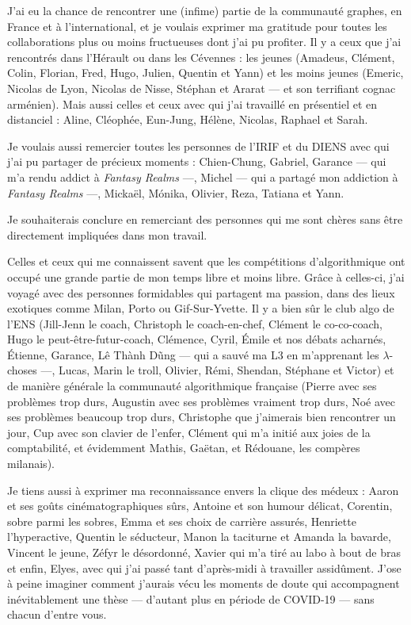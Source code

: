 \medskip

J'ai eu la chance de rencontrer une (infime) partie de la communauté graphes, en France et à l'international, et je voulais exprimer ma gratitude pour toutes les collaborations plus ou moins fructueuses dont j'ai pu profiter. Il y a ceux que j'ai rencontrés dans l'Hérault ou dans les Cévennes : les jeunes (Amadeus, Clément, Colin, Florian, Fred, Hugo, Julien, Quentin et Yann) et les moins jeunes (Emeric, Nicolas de Lyon, Nicolas de Nisse, Stéphan et Ararat — et son terrifiant cognac arménien). Mais aussi celles et ceux avec qui j'ai travaillé en présentiel et en distanciel : Aline, Cléophée, Eun-Jung, Hélène, Nicolas, Raphael et Sarah.

\smallskip
Je voulais aussi remercier toutes les personnes de l'IRIF et du DIENS avec qui j'ai pu partager de précieux moments : Chien-Chung, Gabriel, Garance — qui m'a rendu addict à \emph{Fantasy Realms} —, Michel — qui a partagé mon addiction à \emph{Fantasy Realms} —, Mickaël, Mónika, Olivier, Reza, Tatiana et Yann.

\bigskip

Je souhaiterais conclure en remerciant des personnes qui me sont chères sans être directement impliquées dans mon travail.


\medskip


Celles et ceux qui me connaissent savent que les compétitions d'algorithmique ont occupé une grande partie de mon temps libre et moins libre. Grâce à celles-ci, j'ai voyagé avec des personnes formidables qui partagent ma passion, dans des lieux exotiques comme Milan, Porto ou Gif-Sur-Yvette.
Il y a bien sûr le club algo de l'ENS (Jill-Jenn le coach, Christoph le coach-en-chef, Clément le co-co-coach, Hugo le peut-être-futur-coach, Clémence, Cyril, Émile et nos débats acharnés, Étienne, Garance, Lê Thành Dũng — qui a sauvé ma L3 en m'apprenant les $\lambda$-choses —, Lucas, Marin le troll, Olivier, Rémi, Shendan, Stéphane et Victor) et de manière générale la communauté algorithmique française (Pierre avec ses problèmes trop durs, Augustin avec ses problèmes vraiment trop durs, Noé avec ses problèmes beaucoup trop durs, Christophe que j'aimerais bien rencontrer un jour, Cup avec son clavier de l'enfer, Clément qui m'a initié aux joies de la comptabilité, et évidemment Mathis,  Gaëtan, et Rédouane, les compères milanais).


\smallskip

Je tiens aussi à exprimer ma reconnaissance envers la clique des médeux : Aaron et ses goûts cinématographiques sûrs, Antoine et son humour délicat, Corentin, sobre parmi les sobres, Emma et ses choix de carrière assurés, Henriette l'hyperactive, Quentin le séducteur,  Manon la taciturne et Amanda la bavarde, Vincent le jeune, Zéfyr le désordonné, Xavier qui m'a tiré au labo à bout de bras et enfin, Elyes, avec qui j'ai passé tant d'après-midi à travailler assidûment. J'ose à peine imaginer comment j'aurais vécu les moments de doute qui accompagnent inévitablement une thèse — d'autant plus en période de COVID-19 — sans chacun d'entre vous.

